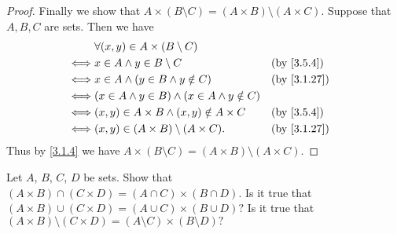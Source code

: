 \begin{proof}
  Finally we show that \(A \times (B \setminus C) = (A \times B) \setminus (A \times C)\).
  Suppose that \(A, B, C\) are sets.
  Then we have
  \begin{align*}
         & \forall (x, y) \in A \times (B \setminus C)                               \\
    \iff & x \in A \land y \in B \setminus C                        &  & \by{3.5.4}  \\
    \iff & x \in A \land (y \in B \land y \notin C)                 &  & \by{3.1.27} \\
    \iff & (x \in A \land y \in B) \land (x \in A \land y \notin C)                  \\
    \iff & (x, y) \in A \times B \land (x, y) \notin A \times C     &  & \by{3.5.4}  \\
    \iff & (x, y) \in (A \times B) \setminus (A \times C).          &  & \by{3.1.27}
  \end{align*}
  Thus by \cref{3.1.4} we have \(A \times (B \setminus C) = (A \times B) \setminus (A \times C)\).
\end{proof}

\begin{ex}\label{ex:3.5.5}
  Let \(A\), \(B\), \(C\), \(D\) be sets.
  Show that \((A \times B) \cap (C \times D) = (A \cap C) \times (B \cap D)\).
  Is it true that \((A \times B) \cup (C \times D) = (A \cup C) \times (B \cup D)?\)
  Is it true that \((A \times B) \setminus (C \times D) = (A \setminus C) \times (B \setminus D)?\)
\end{ex}

